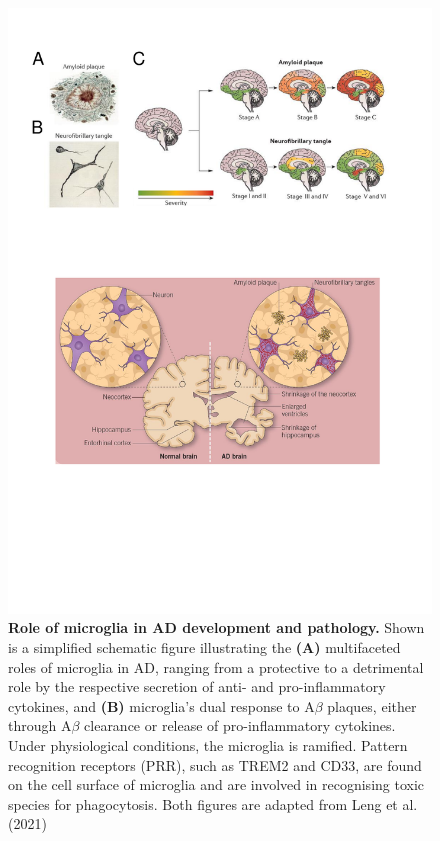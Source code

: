 \begin{figure}[!htp]
	\centering
	\includegraphics[page=8,trim={0 9cm 0cm 0cm},clip, scale = 0.8]{Figures/Introduction_Figures.pdf}
	\captionsetup{width=0.95\textwidth,singlelinecheck=off}
	\caption[Role of microglia in AD development and pathology]%
	{\textbf{Role of microglia in AD development and pathology.} Shown is a simplified schematic figure illustrating the \textbf{(A)} multifaceted roles of microglia in AD, ranging from a protective to a detrimental role by the respective secretion of anti- and pro-inflammatory cytokines, and \textbf{(B)} microglia's dual response to A$\beta$ plaques, either through A$\beta$ clearance or release of pro-inflammatory cytokines. Under physiological conditions, the microglia is ramified. Pattern recognition receptors (PRR), such as TREM2 and CD33, are found on the cell surface of microglia and are involved in recognising toxic species for phagocytosis. Both figures are adapted from Leng et al. (2021)\cite{Leng2021a}  
	}
	\label{fig:microglia_AD}
\end{figure}


